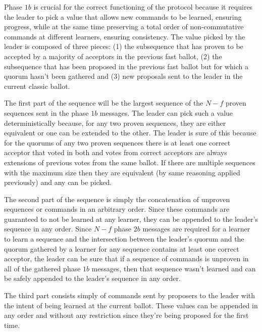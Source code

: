  Phase $1b$ is crucial for the correct functioning of the protocol because it requires the leader to pick a value that allows new commands to be learned, ensuring progress, while at the same time preserving a total order of non-commutative commands at different learners, ensuring consistency. The value picked by the leader is composed of three pieces: (1) the subsequence that has proven to be accepted by a majority of acceptors in the previous fast ballot, (2) the subsequence that has been proposed in the previous fast ballot but for which a quorum hasn't been gathered and (3) new proposals sent to the leader in the current classic ballot. \par
The first part of the sequence will be the largest sequence of the $N-f$ proven sequences sent in the phase $1b$ messages. The leader can pick such a value deterministically because, for any two proven sequences, they are either equivalent or one can be extended to the other. The leader is sure of this because for the quorums of any two proven sequences there is at least one correct acceptor that voted in both and votes from correct acceptors are always extensions of previous votes from the same ballot. If there are multiple sequences with the maximum size then they are equivalent (by same reasoning applied previously) and any can be picked. \par
The second part of the sequence is simply the concatenation of unproven sequences or commands in an arbitrary order. Since these commands are guaranteed to not be learned at any learner, they can be appended to the leader's sequence in any order. Since $N-f$ phase $2b$ messages are required for a learner to learn a sequence and the intersection between the leader's quorum and the quorum gathered by a learner for any sequence contains at least one correct acceptor, the leader can be sure that if a sequence of commands is unproven in all of the gathered phase $1b$ messages, then that sequence wasn't learned and can be safely appended to the leader's sequence in any order. \par 
The third part consists simply of commands sent by proposers to the leader with the intent of being learned at the current ballot. These values can be appended in any order and without any restriction since they're being proposed for the first time.

